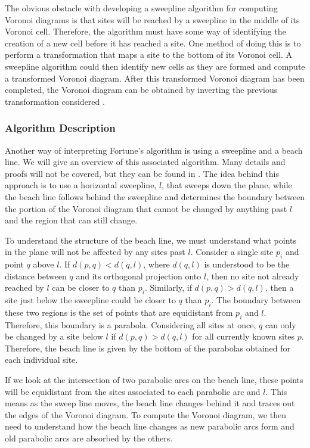 \documentclass[a4paper, 11pt]{article}
\begin{document}
The obvious obstacle with developing a sweepline algorithm for computing Voronoi diagrams is that sites will be reached by a sweepline in the middle
of its Voronoi cell. Therefore, the algorithm must have some way of identifying the creation of a new cell before it has reached a site. One method of
doing this is to perform a transformation that maps a site to the bottom of its Voronoi cell. A sweepline algorithm could then identify new cells as
they are formed and compute a transformed Voronoi diagram. After this transformed Voronoi diagram has been completed, the Voronoi diagram can be
obtained by inverting the previous transformation considered \cite{fortune_sweepline}.

\subsubsection{Algorithm Description}
Another way of interpreting Fortune's algorithm is using a sweepline and a beach line. We will give an overview of this associated algorithm. Many
details and proofs will not be covered, but they can be found in \cite{comp_geom}. The idea behind this approach is to use a
horizontal sweepline, $l$, that sweeps down the plane, while the beach line follows behind the sweepline and determines the boundary between the portion of the Voronoi diagram that cannot be
changed by anything past $l$ and the region that can still change.

To understand the structure of the beach line, we must understand what points in the plane will not be affected by any sites past $l$.
Consider a single site $p_i$ and point $q$ above $l$. If $d(p,q) < d(q,l)$, where $d(q,l)$ is understood to be the distance between $q$ and its
orthogonal projection onto $l$, then
no site not already reached by $l$ can be closer to $q$ than $p_i$. Similarly, if $d(p,q) > d(q,l)$, then a site just
below the sweepline could be closer to $q$ than $p_i$. The boundary between these two regions is the set of points that are equidistant from $p_i$ and
$l$. Therefore, this boundary is a parabola. Considering all sites at once, $q$ can only be changed by a site below $l$ if $d(p,q) > d(q,l)$ for all
currently known sites $p$. Therefore, the beach line is given by the bottom of the parabolas obtained for each individual site.

If we look at the intersection of two parabolic arcs on the beach line, these points will be equidistant from the sites associated to each parabolic
arc and $l$. This means as the sweep line moves, the beach line changes behind it and traces out the edges of the Voronoi diagram. To compute the
Voronoi diagram, we then need to understand how the beach line changes as new parabolic arcs form and old parabolic arcs are absorbed by the others.
\end{document}
